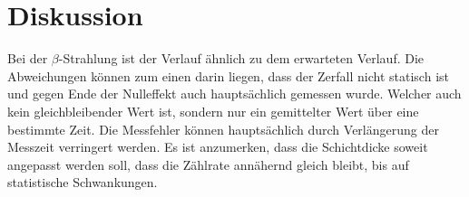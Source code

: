 \section{Diskussion}
\label{sec:Diskussion}






Bei der $\beta$-Strahlung ist der Verlauf ähnlich zu dem erwarteten Verlauf. Die Abweichungen können zum einen darin liegen, dass der Zerfall 
nicht statisch ist und gegen Ende der Nulleffekt auch hauptsächlich gemessen wurde. Welcher auch kein gleichbleibender Wert ist, sondern nur ein 
gemittelter Wert über eine bestimmte Zeit.
Die Messfehler können hauptsächlich durch Verlängerung der Messzeit verringert werden.
Es ist anzumerken, dass die Schichtdicke soweit angepasst werden soll, dass die Zählrate annähernd gleich bleibt, 
bis auf statistische Schwankungen.

